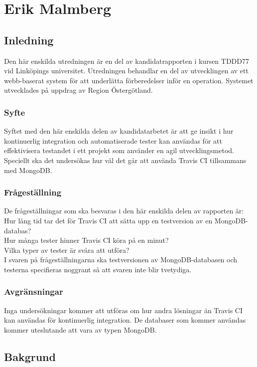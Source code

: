 \section{Erik Malmberg}
\subsection{Inledning}
Den här enskilda utredningen är en del av kandidatrapporten i kursen TDDD77 vid Linköpings universitet.
Utredningen behandlar en del av utvecklingen av ett webb-baserat system för att underlätta förberedelser
inför en operation. Systemet utvecklades på uppdrag av Region Östergötland.

\subsubsection{Syfte}
Syftet med den här enskilda delen av kandidatarbetet är att ge insikt i hur kontinuerlig integration och 
automatiserade tester kan användas för att effektivisera testandet i ett projekt som använder en agil 
utvecklingsmetod. Speciellt ska det undersökas hur väl det går att använda Travis CI tillsammans med MongoDB.

\subsubsection{Frågeställning}
De frågeställningar som ska besvaras i den här enskilda delen av rapporten är:\\
Hur lång tid tar det för Travis CI att sätta upp en testversion av en MongoDB-databas?\\
Hur många tester hinner Travis CI köra på en minut?\\
Vilka typer av tester är svåra att utföra?\\

I svaren på frågeställningarna ska testversionen av MongoDB-databasen och testerna specifieras noggrant 
så att svaren inte blir tvetydiga.

\subsubsection{Avgränsningar}
Inga undersökningar kommer att utföras om hur andra lösningar än Travis CI kan användas för kontinuerlig 
integration. De databaser som kommer användas kommer uteslutande att vara av typen MongoDB.

\subsection{Bakgrund}

